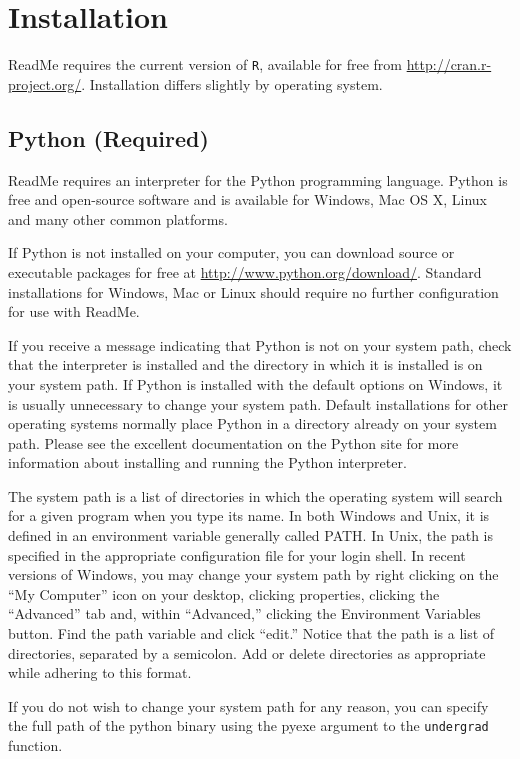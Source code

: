 \documentclass[oneside,letterpaper,titlepage]{article}
\begin{document}
\section{Installation}

ReadMe requires the current version of \texttt{R}, available for free
from \url{http://cran.r-project.org/}.  Installation differs slightly
by operating system.

\subsection{Python (Required)}
ReadMe requires an interpreter for the Python programming language. Python
is free and open-source software and is available for Windows, Mac OS X,
Linux and many other common platforms.

If Python is not installed on your computer, you can download source
or executable packages for free at
\url{http://www.python.org/download/}. Standard installations for
Windows, Mac or Linux should require no further configuration for use
with ReadMe.

If you receive a message indicating that Python is not on your system
path, check that the interpreter is installed and the directory in
which it is installed is on your system path.  If Python is installed
with the default options on Windows, it is usually unnecessary to
change your system path.  Default installations for other operating
systems normally place Python in a directory already on your system
path.  Please see the excellent documentation on the Python site for
more information about installing and running the Python interpreter.

The system path is a list of directories in which the operating system
will search for a given program when you type its name. In both
Windows and Unix, it is defined in an environment variable generally
called PATH.  In Unix, the path is specified in the appropriate
configuration file for your login shell. In recent versions of
Windows, you may change your system path by right clicking on the ``My
Computer'' icon on your desktop, clicking properties, clicking the
``Advanced'' tab and, within ``Advanced,'' clicking the Environment
Variables button. Find the path variable and click ``edit.'' Notice
that the path is a list of directories, separated by a semicolon. Add
or delete directories as appropriate while adhering to this format.

If you do not wish to change your system path for any reason, you can
specify the full path of the python binary using the pyexe argument to the
\texttt{undergrad} function.
\end{document}
